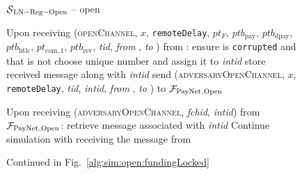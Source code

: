 \begin{figure}[!htbp]
\begin{simulatorbox}{$\mathcal{S}{}_{\mathrm{LN - Reg - Open}}$ --
  open}
\begin{algorithmic}[1]
      \State Upon receiving (\textsc{openChannel}, $x$,
      \texttt{remoteDelay}, $pt_F$, $ptb_{\mathrm{pay}}$, $ptb_{\mathrm{dpay}}$,
      $ptb_{\mathrm{htlc}}$, $pt_{\mathrm{com}, 1}$, $ptb_{\mathrm{rev}}$,
      \textit{tid}, \textit{from} \alice, \textit{to} \bob) from \adversary{}:
      \label{alg:sim:open:adv}
      \Indent
        \State ensure \alice{} is \texttt{corrupted} and that \bob{} is not
        \State choose unique number and assign it to \textit{intid}
        \State store received message along with \textit{intid}
        \State send (\textsc{adversaryOpenChannel}, $x$, \texttt{remoteDelay},
        \textit{tid}, \textit{intid}, \textit{from} \alice, \textit{to} \bob)
        to $\mathcal{F}_{\mathrm{PayNet}}{}_{\mathrm{, Open}}$
        \label{alg:sim:open:adv:send}
      \EndIndent
      \Statex

      \State Upon receiving (\textsc{adversaryOpenChannel},
      \textit{fchid}, \textit{intid}) from $\mathcal{F}_{\mathrm{PayNet}}{}_{\mathrm{, Open}}$:
      \label{alg:sim:open:adv:recv}
      \Indent
        \State retrieve message associated with \textit{intid}
        \State Continue simulation with \alice{} receiving the message from \bob
        \label{alg:sim:open:adv:cont}
      \EndIndent
    \end{algorithmic}
    Continued in Fig.~\ref{alg:sim:open:fundingLocked}
  \end{simulatorbox}
  \caption{}
  \label{alg:sim:open}
\end{figure}

